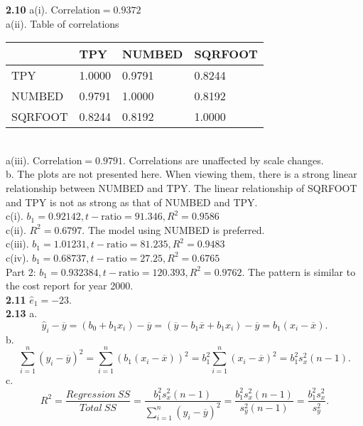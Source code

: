 \textbf{2.10}
a(i).  Correlation$= 0.9372$\\
a(ii). Table of correlations
\begin{table}[hb]
   \begin{tabular}{llll}
   \hline
   &TPY &   NUMBED &  SQRFOOT  \\\hline
TPY  &   1.0000 & 0.9791 & 0.8244\\
NUMBED &  0.9791 & 1.0000 & 0.8192\\
SQRFOOT & 0.8244 & 0.8192 & 1.0000\\
  \hline
   \end{tabular}
\end{table}\\
a(iii). Correlation$= 0.9791.$ Correlations are unaffected by scale changes.\\
b. The plots are not presented here. When viewing them, there is a
strong linear relationship between NUMBED and TPY. The linear
relationship of SQRFOOT and TPY is not as strong as that of NUMBED
and TPY.\\
c(i). $b_1=0.92142, t-\mathrm{ratio}=91.346, R^2=0.9586$\\
c(ii). $R^2 =0.6797.$ The model using NUMBED is preferred.\\
c(iii). $b_1 =1.01231, t-\mathrm{ratio}=81.235, R^2=0.9483$\\
c(iv). $b_1 =0.68737, t-\mathrm{ratio}=27.25, R^2=0.6765$\\
Part 2: $b_1=0.932384, t-\mathrm{ratio}=120.393, R^2=0.9762.$ The pattern is similar to the cost report for year 2000.\\



\textbf{2.11} $\hat{e}_1 = -23.$\\

\textbf{2.13} a.
\begin{equation*}
\hat{y}_i - \overline{y} = (b_0 + b_1 x_i) - \overline{y} = (\overline{y}-b_1 \overline{x} + b_1 x_i) - \overline{y} = b_1(x_i - \overline{x}).
\end{equation*}
b. \begin{equation*} \sum^n_{i=1}(y_i - \overline{y})^2 =
\sum^n_{i=1}(b_1(x_i - \overline{x}))^2 = b_1^2 \sum_{i=1}^n(x_i -
\overline{x})^2 = b_1^2 s_x^2(n-1).
\end{equation*}
c. \begin{equation*} R^2 = \frac{Regression ~SS}{Total ~SS} =
\frac{b_1^2 s_x^2(n-1)}{\sum_{i=1}^n(y_i - \overline{y})^2} =
\frac{b_1^2 s_x^2(n-1)}{s_y^2(n-1)} = \frac{b_1^2 s_x^2}{s_y^2}.
\end{equation*}\\

